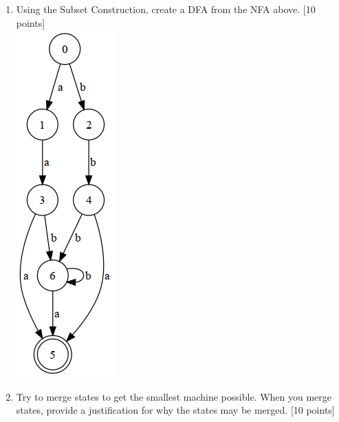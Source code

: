 \documentclass{article}
\begin{document}
\begin{enumerate}
  \item Using the Subset Construction, create a DFA from the NFA above. [10 points]\\
  \includegraphics{dfa.png}\\

  \item Try to merge states to get the smallest machine possible.  When you merge states, provide a justification for why the states may be merged. [10 points]
  \end{enumerate}
\end{document}
